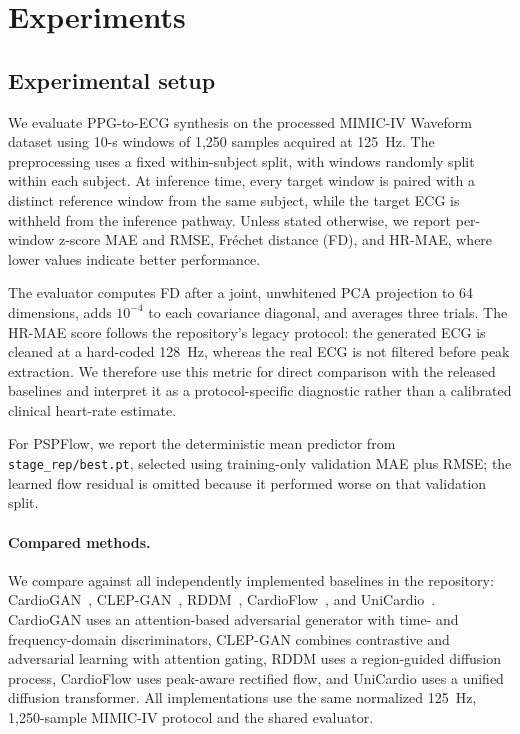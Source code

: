 
\section{Experiments}
\label{sec:experiments}

\subsection{Experimental setup}
\label{sec:experimental-setup}

We evaluate PPG-to-ECG synthesis on the processed MIMIC-IV Waveform dataset using 10-s windows of 1,250 samples acquired at 125~Hz. The preprocessing uses a fixed within-subject split, with windows randomly split within each subject. At inference time, every target window is paired with a distinct reference window from the same subject, while the target ECG is withheld from the inference pathway. Unless stated otherwise, we report per-window z-score MAE and RMSE, Fr\'echet distance (FD), and HR-MAE, where lower values indicate better performance.

The evaluator computes FD after a joint, unwhitened PCA projection to 64 dimensions, adds $10^{-4}$ to each covariance diagonal, and averages three trials. The HR-MAE score follows the repository's legacy protocol: the generated ECG is cleaned at a hard-coded 128~Hz, whereas the real ECG is not filtered before peak extraction. We therefore use this metric for direct comparison with the released baselines and interpret it as a protocol-specific diagnostic rather than a calibrated clinical heart-rate estimate.

For PSPFlow, we report the deterministic mean predictor from \texttt{stage\_rep/best.pt}, selected using training-only validation MAE plus RMSE; the learned flow residual is omitted because it performed worse on that validation split.

\paragraph{Compared methods.}
We compare against all independently implemented baselines in the repository: CardioGAN~\citep{sarkar2021cardiogan}, CLEP-GAN~\citep{li2025clepgan}, RDDM~\citep{shome2024rddm}, CardioFlow~\citep{nambu2025cardioflow}, and UniCardio~\citep{chen2026unicardio}. CardioGAN uses an attention-based adversarial generator with time- and frequency-domain discriminators, CLEP-GAN combines contrastive and adversarial learning with attention gating, RDDM uses a region-guided diffusion process, CardioFlow uses peak-aware rectified flow, and UniCardio uses a unified diffusion transformer. All implementations use the same normalized 125~Hz, 1,250-sample MIMIC-IV protocol and the shared evaluator.

